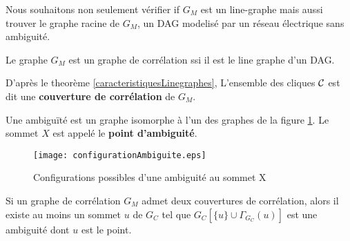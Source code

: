 Nous souhaitons non seulement v\'erifier if $G_M$ est un line-graphe mais aussi trouver le graphe racine de $G_M$, un DAG modelis\'e par un r\'eseau \'electrique sans ambiguit\'e.
\newline 
\begin{definition}
	Le graphe $G_M$ est un graphe de corr\'elation ssi il est le line graphe d'un DAG.
\end{definition}
D'apr\`es le theor\`eme \ref{caracteristiquesLinegraphes}, L'ensemble des cliques $\cal C$ est dit une {\bf couverture de corr\'elation} de $G_M$.

\begin{definition}
Une ambigu\"{i}t\'e est un graphe isomorphe \`a l'un des graphes de la figure \ref{configurationAmbiguite}. Le sommet $X$ est appel\'e le {\bf point d'ambiguit\'e}.
\end{definition}

\begin{figure}[htb!]\vspace{-0.5em}
	\centering
	\texttt{[image: configurationAmbiguite.eps]}\vspace{-0.5em}
	\caption{ Configurations possibles d'une ambiguit\'e au sommet X }\vspace{-0.5em}
	\label{configurationAmbiguite}
\end{figure}

\begin{lemma}
	Si un graphe de corr\'elation $G_M$ admet deux couvertures de corr\'elation, alors il existe au moins un sommet $u$ de $G_C$ tel que $G_{C}[\{u\} \cup \Gamma_{G_C}(u)]$ est une ambiguit\'e dont $u$ est le point.
\end{lemma}
	
